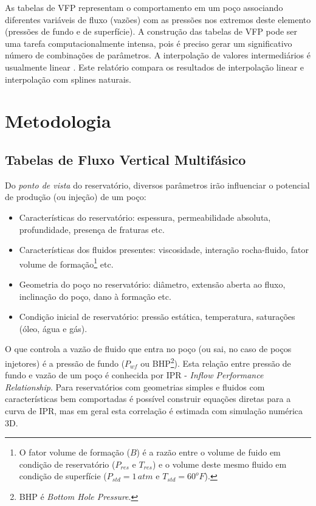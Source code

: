\documentclass[final,5p]{elsarticle}
\numberwithin{equation}{section}
\begin{document}
    As tabelas de VFP representam o comportamento em um poço associando diferentes variáveis de fluxo (vazões) com as pressões nos extremos deste elemento (pressões de fundo e de superfície). A construção das tabelas de VFP pode ser uma tarefa computacionalmente intensa, pois é preciso gerar um significativo número de combinações de parâmetros. A interpolação de valores intermediários é usualmente linear \cite{computer2022cmg}\cite{schlumberger2009technical}. Este relatório compara os resultados de interpolação linear e interpolação com splines naturais.

\section{Metodologia}

    \subsection{Tabelas de Fluxo Vertical Multifásico}

        Do \emph{ponto de vista} do reservatório, diversos parâmetros irão influenciar o potencial de produção (ou injeção) de um poço:

        \begin{itemize}
            \item Características do reservatório: espessura, permeabilidade absoluta, profundidade, presença de fraturas etc.
            \item Características dos fluidos presentes: viscosidade, interação rocha-fluido, fator volume de formação\footnote{O fator volume de formação ($B$) é a razão entre o volume de fuido em condição de reservatório ($P_{res}$ e $T_{res}$) e o volume deste mesmo fluido em condição de superfície ($P_{std}=1 \, atm$ e $T_{std}=60^oF$).} etc.
            \item Geometria do poço no reservatório: diâmetro, extensão aberta ao fluxo, inclinação do poço, dano à formação etc.
            \item Condição inicial de reservatório: pressão estática, temperatura, saturações (óleo, água e gás).
        \end{itemize}
        
        O que controla a vazão de fluido que entra no poço (ou sai, no caso de poços injetores) é a pressão de fundo ($P_{wf}$ ou BHP\footnote{BHP é \emph{Bottom Hole Pressure}.}). Esta relação entre pressão de fundo e vazão de um poço é conhecida por IPR - \emph{Inflow Performance Relationship}. Para reservatórios com geometrias simples e fluidos com características bem comportadas é possível construir equações diretas para a curva de IPR, mas em geral esta correlação é estimada com simulação numérica 3D.
\end{document}
